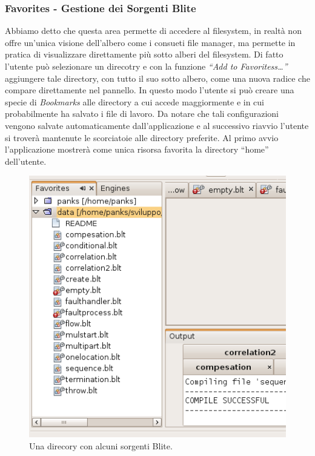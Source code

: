 \subsubsection*{Favorites - Gestione dei Sorgenti Blite}

Abbiamo detto che questa area permette di accedere al filesystem, in realtà
non offre un'unica visione dell'albero come i consueti file manager, ma
permette in pratica di visualizzare direttamente più sotto alberi del
filesystem. Di fatto l'utente può selezionare un direcotry e con la funzione \emph{``Add to
Favoritess\ldots''} aggiungere tale directory, con tutto il suo sotto albero,
come una nuova radice che compare direttamente nel pannello. In questo modo l'utente
si può creare una specie di \emph{Bookmarks} alle directory a cui accede
maggiormente e in cui probabilmente ha salvato i file di lavoro. Da notare che
tali configurazioni vengono salvate automaticamente dall'applicazione e al
successivo riavvio l'utente si troverà mantenute le scorciatoie alle directory
preferite. Al primo avvio l'applicazione mostrerà come unica risorsa favorita
la directory ``home'' dell'utente.

\begin{figure}[h]
\begin{center}
\includegraphics[scale=0.65]
{blide/dia/BlideFavo}
\caption[Il pannello ``Favorites'']{Una direcory con alcuni sorgenti Blite.}
  \label{fig:blideFavo}
\end{center}
\end{figure}

